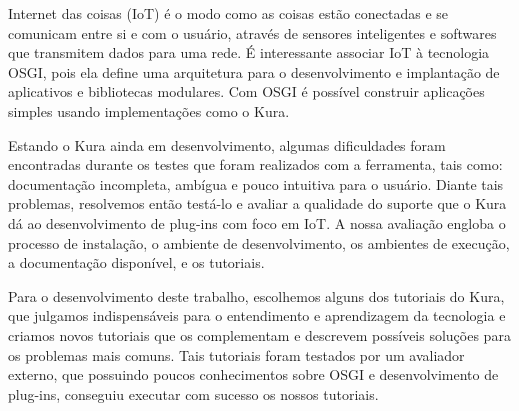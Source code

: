 Internet das coisas (IoT) é o modo como as coisas estão conectadas e se comunicam entre si e com o usuário, através de sensores inteligentes e softwares que transmitem dados para uma rede. É interessante associar IoT à tecnologia OSGI, pois ela define uma arquitetura para o desenvolvimento e implantação de aplicativos e bibliotecas modulares. Com OSGI é possível construir aplicações simples usando implementações como o Kura.

Estando o Kura ainda em desenvolvimento, algumas dificuldades foram encontradas durante os testes que foram realizados com a ferramenta, tais como: documentação incompleta, ambígua e pouco intuitiva para o usuário. Diante tais problemas, resolvemos então testá-lo e avaliar a qualidade do suporte que o Kura dá ao desenvolvimento de plug-ins com foco em IoT. A nossa avaliação engloba o processo de instalação, o ambiente de desenvolvimento, os ambientes de execução, a documentação disponível, e os tutoriais.

Para o desenvolvimento deste trabalho, escolhemos alguns dos tutoriais do Kura, que julgamos indispensáveis para o entendimento e aprendizagem da tecnologia e criamos novos tutoriais que os complementam e descrevem possíveis soluções para os problemas mais comuns. Tais tutoriais foram testados por um avaliador externo, que possuindo poucos conhecimentos sobre OSGI e desenvolvimento de plug-ins, conseguiu executar com sucesso os nossos tutoriais.